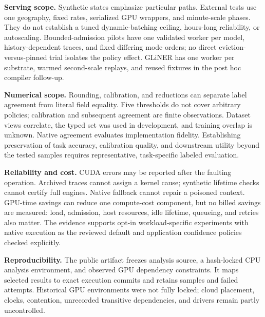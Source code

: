 \documentclass[10pt,twocolumn]{article}
\begin{document}
\textbf{Serving scope.} Synthetic states emphasize particular paths. External tests use one geography, fixed rates, serialized GPU wrappers, and minute-scale phases. They do not establish a tuned dynamic-batching ceiling, hours-long reliability, or autoscaling. Bounded-admission pilots have one validated worker per model, history-dependent traces, and fixed differing mode orders; no direct eviction-versus-pinned trial isolates the policy effect. GLiNER has one worker per substrate, warmed second-scale replays, and reused fixtures in the post hoc compiler follow-up.

\textbf{Numerical scope.} Rounding, calibration, and reductions can separate label agreement from literal field equality. Five thresholds do not cover arbitrary policies; calibration and subsequent agreement are finite observations. Dataset views correlate, the typed set was used in development, and training overlap is unknown. Native agreement evaluates implementation fidelity. Establishing preservation of task accuracy, calibration quality, and downstream utility beyond the tested samples requires representative, task-specific labeled evaluation.

\textbf{Reliability and cost.} CUDA errors may be reported after the faulting operation. Archived traces cannot assign a kernel cause; synthetic lifetime checks cannot certify full engines. Native fallback cannot repair a poisoned context. GPU-time savings can reduce one compute-cost component, but no billed savings are measured: load, admission, host resources, idle lifetime, queueing, and retries also matter. The evidence supports opt-in workload-specific experiments with native execution as the reviewed default and application confidence policies checked explicitly.

\textbf{Reproducibility.} The public artifact freezes analysis source, a hash-locked CPU analysis environment, and observed GPU dependency constraints. It maps selected results to exact execution commits and retains samples and failed attempts. Historical GPU environments were not fully locked; cloud placement, clocks, contention, unrecorded transitive dependencies, and drivers remain partly uncontrolled.
\end{document}
